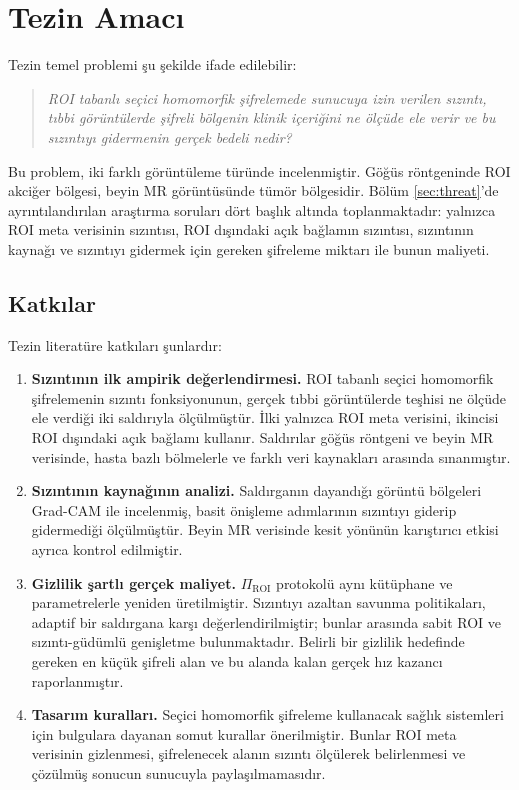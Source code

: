 \section{Tezin Amacı}\label{tezinamaci}

Tezin temel problemi şu şekilde ifade edilebilir:

\begin{quote}
\emph{ROI tabanlı seçici homomorfik şifrelemede sunucuya izin verilen sızıntı, tıbbi görüntülerde şifreli bölgenin klinik içeriğini ne ölçüde ele verir ve bu sızıntıyı gidermenin gerçek bedeli nedir?}
\end{quote}

Bu problem, iki farklı görüntüleme türünde incelenmiştir. Göğüs röntgeninde ROI akciğer bölgesi, beyin MR görüntüsünde tümör bölgesidir. Bölüm \ref{sec:threat}'de ayrıntılandırılan araştırma soruları dört başlık altında toplanmaktadır: yalnızca ROI meta verisinin sızıntısı, ROI dışındaki açık bağlamın sızıntısı, sızıntının kaynağı ve sızıntıyı gidermek için gereken şifreleme miktarı ile bunun maliyeti.

\subsection{Katkılar}\label{katkilar}

Tezin literatüre katkıları şunlardır:

\begin{enumerate}
\item \textbf{Sızıntının ilk ampirik değerlendirmesi.} ROI tabanlı seçici homomorfik şifrelemenin sızıntı fonksiyonunun, gerçek tıbbi görüntülerde teşhisi ne ölçüde ele verdiği iki saldırıyla ölçülmüştür. İlki yalnızca ROI meta verisini, ikincisi ROI dışındaki açık bağlamı kullanır. Saldırılar göğüs röntgeni ve beyin MR verisinde, hasta bazlı bölmelerle ve farklı veri kaynakları arasında sınanmıştır.
\item \textbf{Sızıntının kaynağının analizi.} Saldırganın dayandığı görüntü bölgeleri Grad-CAM ile incelenmiş, basit önişleme adımlarının sızıntıyı giderip gidermediği ölçülmüştür. Beyin MR verisinde kesit yönünün karıştırıcı etkisi ayrıca kontrol edilmiştir.
\item \textbf{Gizlilik şartlı gerçek maliyet.} $\Pi_{\mathrm{ROI}}$ protokolü aynı kütüphane ve parametrelerle yeniden üretilmiştir. Sızıntıyı azaltan savunma politikaları, adaptif bir saldırgana karşı değerlendirilmiştir; bunlar arasında sabit ROI ve sızıntı-güdümlü genişletme bulunmaktadır. Belirli bir gizlilik hedefinde gereken en küçük şifreli alan ve bu alanda kalan gerçek hız kazancı raporlanmıştır.
\item \textbf{Tasarım kuralları.} Seçici homomorfik şifreleme kullanacak sağlık sistemleri için bulgulara dayanan somut kurallar önerilmiştir. Bunlar ROI meta verisinin gizlenmesi, şifrelenecek alanın sızıntı ölçülerek belirlenmesi ve çözülmüş sonucun sunucuyla paylaşılmamasıdır.
\end{enumerate}

